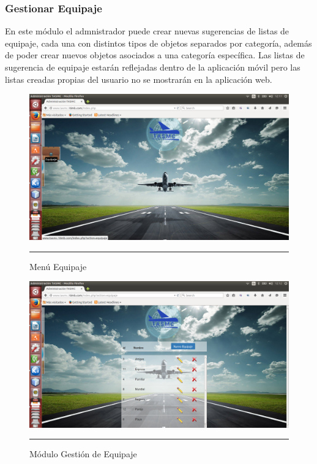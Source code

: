 \subsubsection{Gestionar Equipaje}
En este módulo el admnistrador puede crear nuevas sugerencias de listas de equipaje, cada una con distintos tipos de objetos separados 
por categoría, además de poder crear nuevos objetos asociados a una categoría específica. Las listas de sugerencia de equipaje estarán 
reflejadas dentro de la aplicación móvil pero las listas creadas propias del usuario no se mostrarán en la aplicación web.
\begin{figure}[h!]
	\centering
		\includegraphics[width=1\textwidth]{Figuras/indexEquipaje.png}
		\rule{35em}{0.5pt}
	\caption[Menú Equipaje]{Menú Equipaje}
	\label{fig:menuEquipaje}
\end{figure}
\begin{figure}[h!]
	\centering
		\includegraphics[width=1\textwidth]{Figuras/equipajes.png}
		\rule{35em}{0.5pt}
	\caption[Módulo Gestión de Equipaje]{Módulo Gestión de Equipaje}
	\label{fig:moduloEquipaje}
\end{figure}

